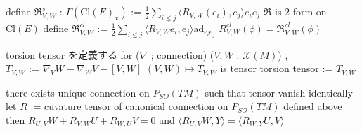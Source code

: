 \begin{Definition}
\itemdefi
  define \(\mathfrak{R}_{V,W}^s\) : \(\Gamma(\text{Cl}(E)_x)\) :=
  \(\frac{1}{2}\sum_{i \lneq j} \langle R_{V,W}(e_i) , e_j \rangle e_i e_j\)
\itemprop
  \(\mathfrak{R}\) is \(2\) form on \(\text{Cl}(E)\)
\itemdefi
  define \(\mathfrak{R}_{V,W}^{cl}\) :=
  \(\frac{1}{2} \sum_{i \lneq j} \langle R_{V,W} e_i , e_j \rangle \text{ad}_{e_i e_j}\)
\itemprop
  \(R_{V,W}^{cl}(\phi) = \mathfrak{R}_{V,W}^{cl}(\phi)\)
\end{Definition}

\begin{Definition}
\itemnote
  torsion tensor を定義する
\itemdefi
  for (\(\nabla\) ; connection) (\(V , W\) : \(\mathcal{X}(M)\)) ,\\
  \(T_{V,W}\) := \(\nabla_V W- \nabla_W V - [V,W]\)
\itemprop
  \((V , W) \mapsto T_{V,W}\) is tensor
\itemdefi
  torsion tensor := \(T_{V,W}\)
\end{Definition}

\begin{Theorem}
\itemprop
  there exists unique connection on \(P_{SO}(TM)\) such that tensor vanish identically
\itemprop
  let \(R\) := cuvature tensor of canonical connection on \(P_{SO}(TM)\) defined above \\
  then \(R_{U,V}W + R_{V,W}U + R_{W,U}V = 0\) and \(\langle R_{U,V} W , Y \rangle = \langle R_{W,Y} U , V \rangle\)
\end{Theorem}
